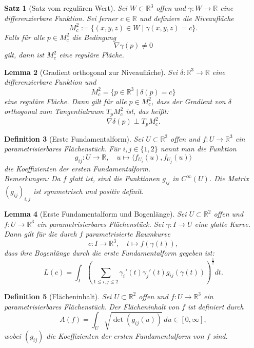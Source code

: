 \documentclass[a4paper,12pt]{article}
\theoremstyle{break}
\newtheorem{definition}{Definition}[section]
\newtheorem{theorem}[definition]{Satz}
\newtheorem{lemma}[definition]{Lemma}
\begin{document}
\begin{theorem}[Satz vom regulären Wert]
Sei $W \subset \mathbb{R}^3$ offen und $\gamma: W \to \mathbb{R}$ eine differenzierbare Funktion. Sei ferner $c \in \mathbb{R}$ und definiere die Niveaufläche
\[
M_c^2 := \{ (x,y,z) \in W \mid \gamma(x,y,z) = c \}.
\]
Falls für alle $p \in M_c^2$ die Bedingung
\[
\nabla \gamma(p) \neq 0
\]
gilt, dann ist $M_c^2$ eine reguläre Fläche.
\end{theorem}

\begin{lemma}[Gradient orthogonal zur Niveaufläche]
Sei $\delta: \mathbb{R}^3 \to \mathbb{R}$ eine differenzierbare Funktion und 
\[
M_c^2 = \{ p \in \mathbb{R}^3 \mid \delta(p) = c \}
\]
eine reguläre Fläche. Dann gilt für alle $p \in M_c^2$, dass der Gradient von $\delta$ orthogonal zum Tangentialraum $T_p M_c^2$ ist, das heißt:
\[
\nabla \delta(p) \perp T_p M_c^2.
\]
\end{lemma}

\begin{definition}[Erste Fundamentalform]
Sei $U \subset \mathbb{R}^2$ offen und $f: U \to \mathbb{R}^3$ ein parametrisierbares Flächenstück. Für $i,j \in \{1,2\}$ nennt man die Funktion
\[
g_{ij}: U \to \mathbb{R}, \quad u \mapsto \langle f_{U_i}(u), f_{U_j}(u) \rangle
\]
die \emph{Koeffizienten der ersten Fundamentalform}. \\

Bemerkungen:
Da $f$ glatt ist, sind die Funktionen $g_{ij}$ in $C^\infty(U)$. Die Matrix 
$(g_{ij})_{i,j}$
ist symmetrisch und positiv definit.
\end{definition}

\begin{lemma}[Erste Fundamentalform und Bogenlänge]
Sei $U \subset \mathbb{R}^2$ offen und $f: U \to \mathbb{R}^3$ ein parametrisierbares Flächenstück. Sei $\gamma: I \to U$ eine glatte Kurve. Dann gilt für die durch $f$ parametrisierte Raumkurve 
\[
c: I \to \mathbb{R}^3, \quad t \mapsto f(\gamma(t)),
\]
dass ihre Bogenlänge durch die erste Fundamentalform gegeben ist:
\[
L(c) = \int_I \left( \sum_{1 \leq i,j \leq 2} \gamma_i'(t) \gamma_j'(t) g_{ij}(\gamma(t)) \right)^{\frac{1}{2}} dt.
\]
\end{lemma}

\begin{definition}[Flächeninhalt]
Sei $U \subset \mathbb{R}^2$ offen und $f: U \to \mathbb{R}^3$ ein parametrisierbares Flächenstück. Der \emph{Flächeninhalt} von $f$ ist definiert durch
\[
A(f) = \int_U \sqrt{\det (g_{ij}(u))} \, du \in [0, \infty],
\]
wobei $(g_{ij})$ die Koeffizienten der ersten Fundamentalform von $f$ sind.
\end{definition}
\end{document}
